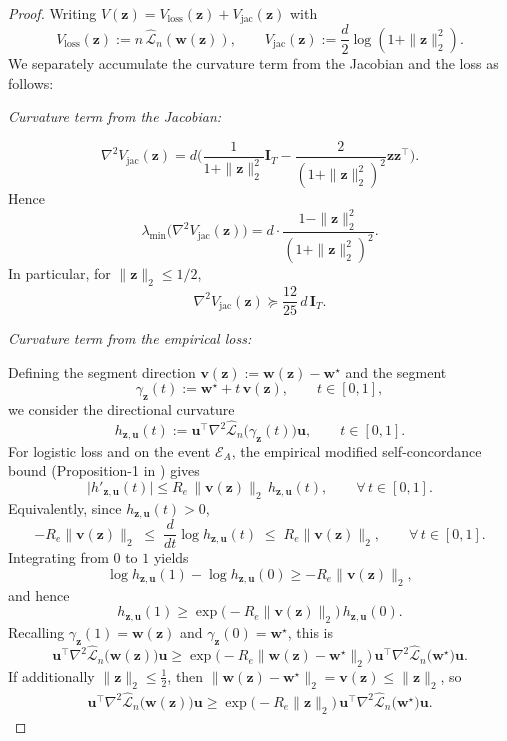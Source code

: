 \documentclass{article}
\theoremstyle{plain}
\theoremstyle{definition}
\theoremstyle{remark}
\begin{document}
{\begin{proof}
Writing $V(\mathbf z)=V_{\mathrm{loss}}(\mathbf z)+V_{\mathrm{jac}}(\mathbf z)$ with
\[
V_{\mathrm{loss}}(\mathbf z):=n\,\widehat{\mathcal L}_n(\mathbf{w}(\mathbf{z})),
\qquad
V_{\mathrm{jac}}(\mathbf z):=\frac{d}{2}\log(1+\|\mathbf z\|_2^2).
\]
We separately accumulate the curvature term from the Jacobian and the loss as follows:

\textit{Curvature term from the Jacobian:}

\[
\nabla^2 V_{\mathrm{jac}}(\mathbf z)
=
d\Big(\frac{1}{1+\|\mathbf z\|_2^2}\mathbf I_T
-\frac{2}{(1+\|\mathbf z\|_2^2)^2}\mathbf z\mathbf z^\top\Big).
\]
Hence
\[
\lambda_{\min}\big(\nabla^2 V_{\mathrm{jac}}(\mathbf z)\big)
=
d\cdot\frac{1-\|\mathbf z\|_2^2}{(1+\|\mathbf z\|_2^2)^2}.
\]
In particular, for $\|\mathbf z\|_2\le 1/2$,
\[
\nabla^2 V_{\mathrm{jac}}(\mathbf z)\succeq \frac{12}{25}\,d\,\mathbf I_T.
\]

\textit{Curvature term from the empirical loss:}

Defining the segment direction $\mathbf{v}(\mathbf{z}):=\mathbf{w}(\mathbf{z})-\mathbf{w}^{\star}$ and the segment
\[
\gamma_{\mathbf{z}}(t):=\mathbf{w}^{\star}+t\,\mathbf{v}(\mathbf{z}),\qquad t\in[0,1],
\]
we consider the directional curvature
\[
h_{\mathbf z,\mathbf u}(t)
:=
\mathbf{u}^{\top}\nabla^{2}\widehat{\mathcal L}_{n}\!\big(\gamma_{\mathbf z}(t)\big)\mathbf{u},
\qquad t\in[0,1].
\]
For logistic loss and on the event $\mathcal{E}_{A}$, the empirical modified self-concordance bound (Proposition-1 in \cite{bach2010self}) gives
\[
\big|h'_{\mathbf z,\mathbf u}(t)\big|
\le
R_{e}\,\|\mathbf v(\mathbf z)\|_{2}\,h_{\mathbf z,\mathbf u}(t),
\qquad \forall\, t\in[0,1].
\]
Equivalently, since $h_{\mathbf z,\mathbf u}(t)>0$,
\[
-R_{e}\|\mathbf v(\mathbf z)\|_{2}
\;\le\;
\frac{d}{dt}\log h_{\mathbf z,\mathbf u}(t)
\;\le\;
R_{e}\|\mathbf v(\mathbf z)\|_{2},
\qquad \forall\, t\in[0,1].
\]
Integrating from $0$ to $1$ yields
\[
\log h_{\mathbf z,\mathbf u}(1)-\log h_{\mathbf z,\mathbf u}(0)
\ge
- R_{e}\|\mathbf v(\mathbf z)\|_{2},
\]
and hence
\[
h_{\mathbf z,\mathbf u}(1)
\ge
\exp\!\big(-R_{e}\|\mathbf v(\mathbf z)\|_{2}\big)\,h_{\mathbf z,\mathbf u}(0).
\]
Recalling $\gamma_{\mathbf z}(1)=\mathbf w(\mathbf z)$ and $\gamma_{\mathbf z}(0)=\mathbf w^{\star}$, this is
\[
\mathbf u^{\top}\nabla^{2}\widehat{\mathcal L}_{n}\!\big(\mathbf w(\mathbf z)\big)\mathbf u
\ge
\exp\!\big(-R_{e}\|\mathbf w(\mathbf z)-\mathbf w^{\star}\|_{2}\big)\,
\mathbf u^{\top}\nabla^{2}\widehat{\mathcal L}_{n}\!\big(\mathbf w^{\star}\big)\mathbf u.
\]
If additionally $\|\mathbf z\|_{2}\le \tfrac12$, then $\|\mathbf w(\mathbf z)-\mathbf w^{\star}\|_{2} =\mathbf{v}(\mathbf{z})\le \|\mathbf z\|_{2}$, so
\begin{align}
    \mathbf u^{\top}\nabla^{2}\widehat{\mathcal L}_{n}\!\big(\mathbf w(\mathbf z)\big)\mathbf u
\ge
\exp\!\big(-R_{e}\|\mathbf z\|_{2}\big)\, 
\mathbf u^{\top}\nabla^{2}\widehat{\mathcal L}_{n}\!\big(\mathbf w^{\star}\big)\mathbf u.
\end{align}


\end{proof}}
\end{document}
